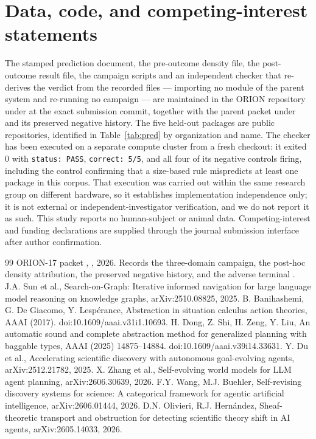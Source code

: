 \documentclass[11pt]{article}
\begin{document}
\section*{Data, code, and competing-interest statements}
The stamped prediction document, the pre-outcome density file, the post-outcome result file, the campaign scripts and an independent checker that re-derives the verdict from the recorded files --- importing no module of the parent system and re-running no campaign --- are maintained in the ORION repository under  at the exact submission commit, together with the parent packet under  and its preserved negative history. The five held-out packages are public repositories, identified in Table~\ref{tab:pred} by organization and name. The checker has been executed on a separate compute cluster from a fresh checkout: it exited $0$ with \texttt{status: PASS}, \texttt{correct: 5/5}, and all four of its negative controls firing, including the control confirming that a size-based rule mispredicts at least one package in this corpus. That execution was carried out within the same research group on different hardware, so it establishes implementation independence only; it is not external or independent-investigator verification, and we do not report it as such. This study reports no human-subject or animal data. Competing-interest and funding declarations are supplied through the journal submission interface after author confirmation.

\begin{thebibliography}{99}
 ORION-17 packet , , 2026. Records the three-domain campaign, the post-hoc density attribution, the preserved negative history, and the adverse terminal .
 J.A. Sun et al., Search-on-Graph: Iterative informed navigation for large language model reasoning on knowledge graphs, arXiv:2510.08825, 2025.
 B. Banihashemi, G. De Giacomo, Y. Lesp\'erance, Abstraction in situation calculus action theories, AAAI (2017). doi:10.1609/aaai.v31i1.10693.
 H. Dong, Z. Shi, H. Zeng, Y. Liu, An automatic sound and complete abstraction method for generalized planning with baggable types, AAAI (2025) 14875--14884. doi:10.1609/aaai.v39i14.33631.
 Y. Du et al., Accelerating scientific discovery with autonomous goal-evolving agents, arXiv:2512.21782, 2025.
 X. Zhang et al., Self-evolving world models for LLM agent planning, arXiv:2606.30639, 2026.
 F.Y. Wang, M.J. Buehler, Self-revising discovery systems for science: A categorical framework for agentic artificial intelligence, arXiv:2606.01444, 2026.
 D.N. Olivieri, R.J. Hern\'andez, Sheaf-theoretic transport and obstruction for detecting scientific theory shift in AI agents, arXiv:2605.14033, 2026.
\end{thebibliography}
\end{document}
